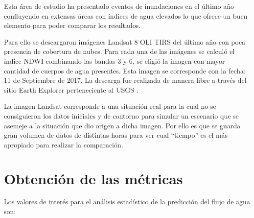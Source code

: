 \documentclass[10pt,a4paper, twoside]{report}
\begin{document}
Esta área de estudio ha presentado eventos de inundaciones en el último año confluyendo en extensas áreas con índices de agua elevados lo que ofrece un buen elemento para poder comparar los resultados.

Para ello se descargaron imágenes Landsat 8 OLI TIRS del último año con poca presencia de cobertura de nubes. Para cada una de las imágenes se calculó el índice NDWI combinando las bandas 3 y 6, se eligió la imagen con mayor cantidad de cuerpos de agua presentes. Esta imagen se corresponde con la fecha: 11 de Septiembre de 2017. La descarga fue realizada de manera libre a través del sitio Earth Explorer perteneciente al USGS \cite{earthExplorer}.

La imagen Landsat corresponde a una situación real para la cual no se consiguieron los datos iniciales y de contorno para simular un escenario que se asemeje a la situación que dio origen a dicha imagen. Por ello es que se guarda gran volumen de datos de distintas horas para ver cual "`tiempo"' es el más apropiado para realizar la comparación.

\section{Obtención de las métricas}
\label{defmetricas}



Los valores de interés para el análisis estadístico de la predicción del flujo de agua son:
\end{document}
